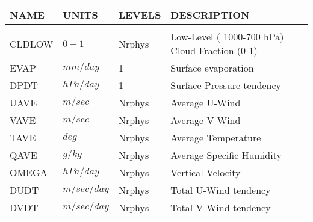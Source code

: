 \newpage
\vspace*{\fill}
\begin{tabular}{llll}
\hline\hline
 NAME & UNITS & LEVELS & DESCRIPTION \\
\hline

&\\
 CLDLOW   &    $0-1$   &  Nrphys 
     &\begin{minipage}[t]{3in}
      {Low-Level ( 1000-700 hPa) Cloud Fraction  (0-1)}
     \end{minipage}\\
 EVAP     &    $mm/day$   &  1 
     &\begin{minipage}[t]{3in}
      {Surface evaporation}
     \end{minipage}\\
 DPDT     &    $hPa/day$ &  1
     &\begin{minipage}[t]{3in}
      {Surface Pressure tendency}
     \end{minipage}\\
 UAVE     &    $m/sec$ &  Nrphys
     &\begin{minipage}[t]{3in}
      {Average U-Wind}
     \end{minipage}\\
 VAVE     &    $m/sec$ &  Nrphys
     &\begin{minipage}[t]{3in}
      {Average V-Wind}
     \end{minipage}\\
 TAVE     &    $deg$ &  Nrphys
     &\begin{minipage}[t]{3in}
      {Average Temperature}
     \end{minipage}\\
 QAVE     &    $g/kg$ &  Nrphys
     &\begin{minipage}[t]{3in}
      {Average Specific Humidity}
     \end{minipage}\\
 OMEGA    &    $hPa/day$ &  Nrphys
     &\begin{minipage}[t]{3in}
      {Vertical Velocity}
     \end{minipage}\\
 DUDT     &    $m/sec/day$ &  Nrphys
     &\begin{minipage}[t]{3in}
      {Total U-Wind tendency}
     \end{minipage}\\
 DVDT     &    $m/sec/day$ &  Nrphys
     &\begin{minipage}[t]{3in}
      {Total V-Wind tendency}
     \end{minipage}\\

\end{tabular}
